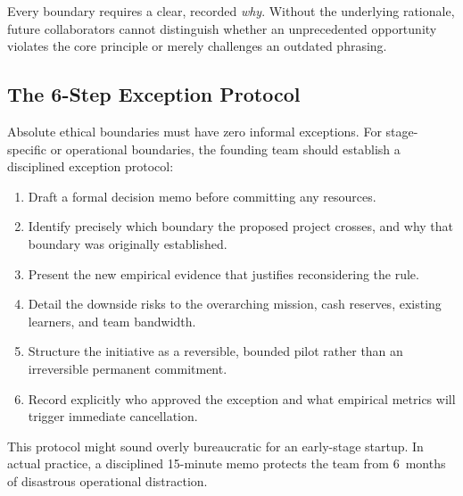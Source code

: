 Every boundary requires a clear, recorded \textit{why}. Without the underlying rationale, future collaborators cannot distinguish whether an unprecedented opportunity violates the core principle or merely challenges an outdated phrasing.

\subsection{The 6-Step Exception Protocol}

Absolute ethical boundaries must have zero informal exceptions. For stage-specific or operational boundaries, the founding team should establish a disciplined exception protocol:

\begin{enumerate}[leftmargin=12pt,itemsep=2pt,topsep=1pt,parsep=0pt]
  \item Draft a formal decision memo before committing any resources.
  \item Identify precisely which boundary the proposed project crosses, and why that boundary was originally established.
  \item Present the new empirical evidence that justifies reconsidering the rule.
  \item Detail the downside risks to the overarching mission, cash reserves, existing learners, and team bandwidth.
  \item Structure the initiative as a reversible, bounded pilot rather than an irreversible permanent commitment.
  \item Record explicitly who approved the exception and what empirical metrics will trigger immediate cancellation.
\end{enumerate}

This protocol might sound overly bureaucratic for an early-stage startup. In actual practice, a disciplined 15-minute memo protects the team from 6~months of disastrous operational distraction.
